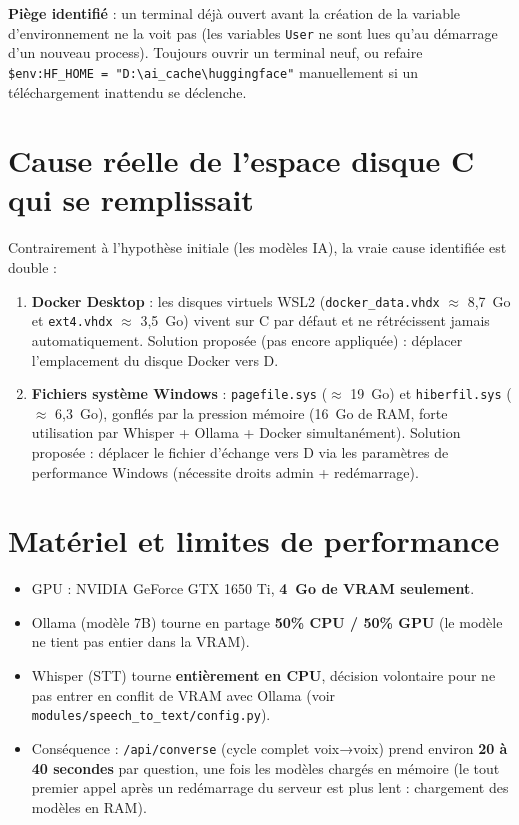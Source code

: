 \documentclass[11pt,a4paper]{report}
\begin{document}
\begin{noteinfo}
\textbf{Piège identifié} : un terminal déjà ouvert avant la création de la variable
d'environnement ne la voit pas (les variables \texttt{User} ne sont lues qu'au démarrage
d'un nouveau process). Toujours ouvrir un terminal neuf, ou refaire
\texttt{\$env:HF\_HOME = "D:\textbackslash ai\_cache\textbackslash huggingface"}
manuellement si un téléchargement inattendu se déclenche.
\end{noteinfo}

\section{Cause réelle de l'espace disque C qui se remplissait}
Contrairement à l'hypothèse initiale (les modèles IA), la vraie cause identifiée est
double :
\begin{enumerate}
    \item \textbf{Docker Desktop} : les disques virtuels WSL2 (\texttt{docker\_data.vhdx}
    $\approx$ 8,7~Go et \texttt{ext4.vhdx} $\approx$ 3,5~Go) vivent sur C par défaut et ne
    rétrécissent jamais automatiquement. Solution proposée (pas encore appliquée) :
    déplacer l'emplacement du disque Docker vers D.
    \item \textbf{Fichiers système Windows} : \texttt{pagefile.sys} ($\approx$ 19~Go) et
    \texttt{hiberfil.sys} ($\approx$ 6,3~Go), gonflés par la pression mémoire (16~Go de
    RAM, forte utilisation par Whisper + Ollama + Docker simultanément). Solution
    proposée : déplacer le fichier d'échange vers D via les paramètres de performance
    Windows (nécessite droits admin + redémarrage).
\end{enumerate}

\section{Matériel et limites de performance}
\begin{itemize}
    \item GPU : NVIDIA GeForce GTX 1650 Ti, \textbf{4~Go de VRAM seulement}.
    \item Ollama (modèle 7B) tourne en partage \textbf{50\% CPU / 50\% GPU} (le modèle ne
    tient pas entier dans la VRAM).
    \item Whisper (STT) tourne \textbf{entièrement en CPU}, décision volontaire pour ne
    pas entrer en conflit de VRAM avec Ollama (voir
    \texttt{modules/speech\_to\_text/config.py}).
    \item Conséquence : \texttt{/api/converse} (cycle complet voix→voix) prend environ
    \textbf{20 à 40 secondes} par question, une fois les modèles chargés en mémoire (le
    tout premier appel après un redémarrage du serveur est plus lent : chargement des
    modèles en RAM).
\end{itemize}
\end{document}
